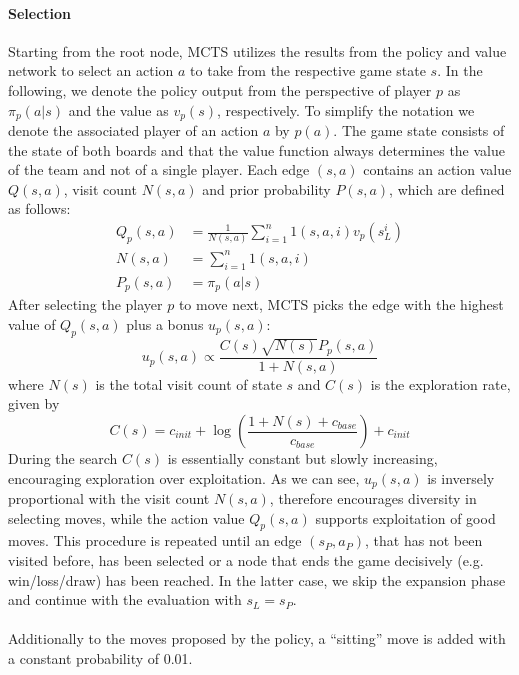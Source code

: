 \paragraph{Selection}
Starting from the root node, MCTS utilizes the results from the policy and value network to select an action $a$ to take from the respective game state $s$.
In the following, we denote the policy output from the perspective of player $p$ as $\pi_p(a|s)$ and the value as $v_p(s)$, respectively.
To simplify the notation we denote the associated player of an action $a$ by $p(a)$.
The game state consists of the state of both boards and that the value function always determines the value of the team and not of a single player.
Each edge $(s,a)$ contains an action value $Q(s,a)$, visit count $N(s,a)$ and prior probability $P(s,a)$, which are defined as follows:
\begin{align*}
    Q_p(s,a) &= \frac{1}{N(s,a)} \sum_{i=1}^{n}1(s,a,i)v_p(s_{L}^{i})\\
    N(s,a) &= \sum_{i=1}^{n}1(s,a,i)\\
    P_p(s,a) &= \pi_p (a|s)
\end{align*}
After selecting the player $p$ to move next, MCTS picks the edge with the highest value of $Q_p(s,a)$ plus a bonus $u_p(s,a)$:
\begin{equation*}
    u_p(s,a) \propto \frac{C(s) \sqrt{N(s)} P_p(s,a)}{1+N(s,a)}
\end{equation*}
where $N(s)$ is the total visit count of state $s$ and $C(s)$ is the exploration rate, given by
\begin{equation*}
    C(s) = c_\textit{init} + \log \left(\frac{1 + N(s) + c_\textit{base}}{c_\textit{base}}\right) + c_\textit{init}
\end{equation*}
During the search $C(s)$ is essentially constant but slowly increasing, encouraging exploration over exploitation.
As we can see, $u_p(s,a)$ is inversely proportional with the visit count $N(s,a)$, therefore encourages diversity in selecting moves, while the action value $Q_p(s,a)$ supports exploitation of good moves.
This procedure is repeated until an edge $(s_P, a_P)$, that has not been visited before, has been selected or a node that ends the game decisively (e.g. win/loss/draw) has been reached.
In the latter case, we skip the expansion phase and continue with the evaluation with $s_L = s_P$.
\\\\
Additionally to the moves proposed by the policy, a ``sitting'' move is added with a constant probability of 0.01.
